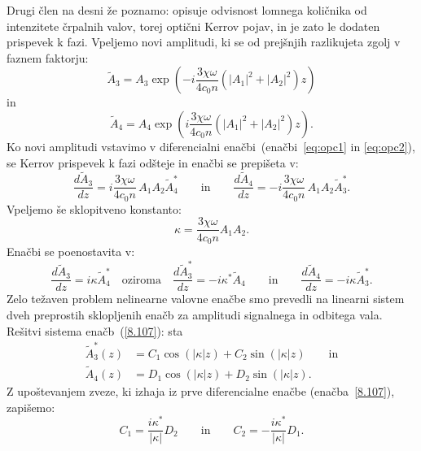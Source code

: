 Drugi člen na desni že poznamo: opisuje odvisnost lomnega količnika
od intenzitete črpalnih valov, torej optični Kerrov
pojav, in je zato le dodaten prispevek
k fazi. Vpeljemo novi amplitudi, ki se od prejšnjih razlikujeta zgolj v faznem faktorju:
\begin{equation}
\tilde{A}_3 = A_3 \exp\left(-i\frac{ 3 \chi \omega}{4 c_0 n}(|A_1|^2 + |A_2|^2) z\right)
\end{equation}
in 
\begin{equation}
\tilde{A}_4 = A_4 \exp\left(i\frac{ 3 \chi \omega}{4 c_0 n}(|A_1|^2 + |A_2|^2)z\right)\!\!.
\end{equation}
Ko novi amplitudi vstavimo v diferencialni enačbi~(enačbi~\ref{eq:opc1} in 
\ref{eq:opc2}), se Kerrov prispevek k fazi odšteje
in enačbi se prepišeta v:
\begin{equation}
\frac{d\tilde{A}_{3}}{dz}=i\frac{ 3 \chi \omega}{4 c_0 n}\,
A_{1}A_{2}\tilde{A}_{4}^{*} \qquad \textrm{in} \qquad 
\frac{d\tilde{A}_{4}}{dz}=-i\frac{ 3 \chi \omega}{4 c_0 n}\,
A_{1}A_{2}\tilde{A}_{3}^*.
\label{8.105}
\end{equation}
Vpeljemo še sklopitveno konstanto:
\begin{equation}
\kappa=\frac{ 3 \chi \omega}{4 c_0 n}A_1 A_2.
\label{8.106}
\end{equation}
Enačbi se poenostavita v:
\begin{equation}
\frac{d\tilde{A}_{3}}{dz}=i\kappa \tilde{A}_{4}^{*} \quad
\textrm{oziroma} \quad \frac{d\tilde{A}^*_{3}}{dz}=-i\kappa^* \tilde{A}_{4} 
\qquad \textrm{in} \qquad
\frac{d\tilde{A}_{4}}{dz}=-i\kappa \tilde{A}_{3}^*.
\label{8.107}
\end{equation}
Zelo težaven problem nelinearne valovne enačbe smo prevedli na linearni
sistem dveh preprostih sklopljenih enačb za amplitudi signalnega in
odbitega vala. Rešitvi sistema enačb~(\ref{8.107}):
sta 
\begin{align}
\tilde{A}_3^* \left(z\right) & =  C_{1}\cos(\left|\kappa\right|z)+
C_{2}\sin(\left|\kappa\right|z)
\label{8.108} \qquad \mathrm{in}\\
\tilde{A}_4 \left(z\right) & =  D_{1}\cos(\left|\kappa\right|z)+
D_{2}\sin(\left|\kappa\right|z).
\label{8.108a}
\end{align}
Z upoštevanjem zveze, ki izhaja  iz prve diferencialne enačbe 
(enačba~\ref{8.107}), zapišemo:
\begin{equation}
C_1 = \frac{i \kappa^*}{|\kappa|}D_2 \qquad
\textrm{in} \qquad 
C_2 = -\frac{i \kappa^*}{|\kappa|}D_1. 
\end{equation}

